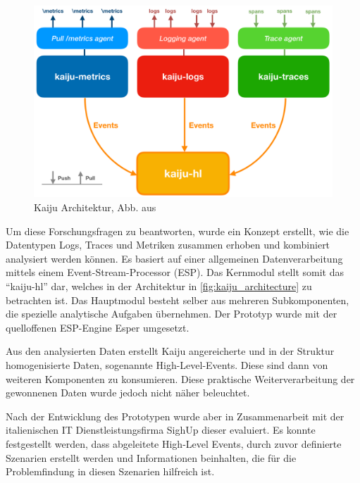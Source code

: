 \begin{figure}
\centering
\includegraphics[width=\linewidth]{img/03_methoden/kaiju_architecture.png}
\caption{Kaiju Architektur, Abb. aus \cite{TheKaijuProjectPaper}}
\label{fig:kaiju_architecture}
\end{figure}

Um diese Forschungsfragen zu beantworten, wurde ein Konzept erstellt, wie die Datentypen Logs, Traces und Metriken zusammen erhoben und kombiniert analysiert werden können. Es basiert auf einer allgemeinen Datenverarbeitung mittels einem Event-Stream-Processor (ESP). Das Kernmodul stellt somit das \enquote{kaiju-hl} dar, welches in der Architektur in \autoref{fig:kaiju_architecture} zu betrachten ist. Das Hauptmodul besteht selber aus mehreren Subkomponenten, die spezielle analytische Aufgaben übernehmen. Der Prototyp wurde mit der quelloffenen ESP-Engine Esper \cite{Esper} umgesetzt.


Aus den analysierten Daten erstellt Kaiju angereicherte und in der Struktur homogenisierte Daten, sogenannte High-Level-Events. Diese sind dann von weiteren Komponenten zu konsumieren. Diese praktische Weiterverarbeitung der gewonnenen Daten wurde jedoch nicht näher beleuchtet.

Nach der Entwicklung des Prototypen wurde aber in Zusammenarbeit mit der italienischen IT Dienstleistungsfirma SighUp dieser evaluiert. Es konnte festgestellt werden, dass abgeleitete High-Level Events, durch zuvor definierte Szenarien erstellt werden und Informationen beinhalten, die für die Problemfindung in diesen Szenarien hilfreich ist.

